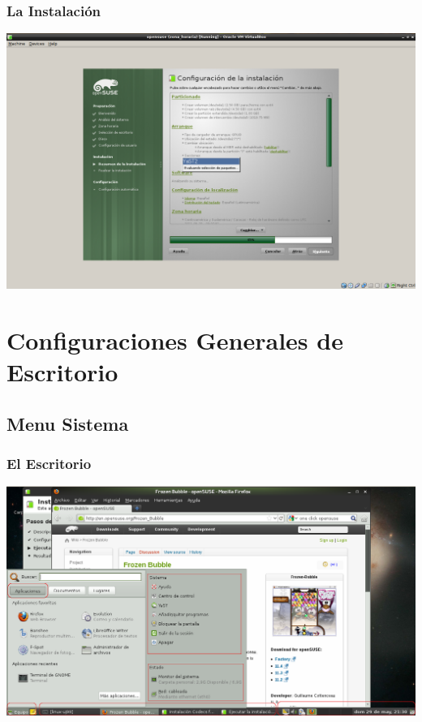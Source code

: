 \documentclass{beamer}
\begin{document}
\begin{frame}
\frametitle{La Instalaci\'on}
\includegraphics[height=0.8\textheight]{20.png} \hspace*{7.3cm}
\end{frame} 

\section{Configuraciones Generales de Escritorio}
\subsection{Menu Sistema}
\begin{frame}
\frametitle{El Escritorio}
\includegraphics[height=0.8\textheight]{desktop1.png} \hspace*{7.3cm}
\end{frame} 
\end{document}
